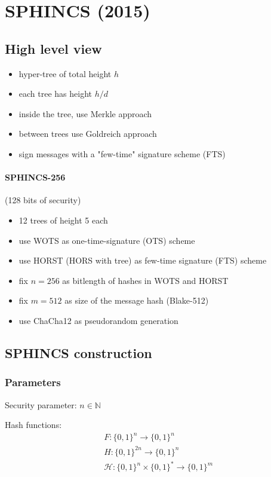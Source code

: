 \documentclass{article}
\theoremstyle{definition}
\begin{document}
\section{SPHINCS (2015)}

\subsection{High level view}

\begin{itemize}
    \item hyper-tree of total height $h$
    \item each tree has height $h/d$
    \item inside the tree, use Merkle approach
    \item between trees use Goldreich approach
    \item sign messages with a "few-time" signature scheme (FTS)
\end{itemize}

\paragraph{SPHINCS-256} (128 bits of security)
\begin{itemize}
    \item 12 trees of height 5 each
    \item use WOTS as one-time-signature (OTS) scheme
    \item use HORST (HORS with tree) as few-time signature (FTS) scheme
    \item fix $n=256$ as bitlength of hashes in WOTS and HORST
    \item fix $m=512$ as size of the message hash (Blake-512)
    \item use ChaCha12 as pseudorandom generation
\end{itemize}

\subsection{SPHINCS construction}
\subsubsection{Parameters}

Security parameter: $n \in \mathbb{N}$

Hash functions:
\begin{align*}
&F: \{0,1\}^n \longrightarrow \{0,1\}^n\\
&H: \{0,1\}^{2n} \longrightarrow \{0,1\}^n\\
&\mathcal{H}: \{0,1\}^n \times \{0,1\}^*  \longrightarrow \{0,1\}^m
\end{align*}
\end{document}
